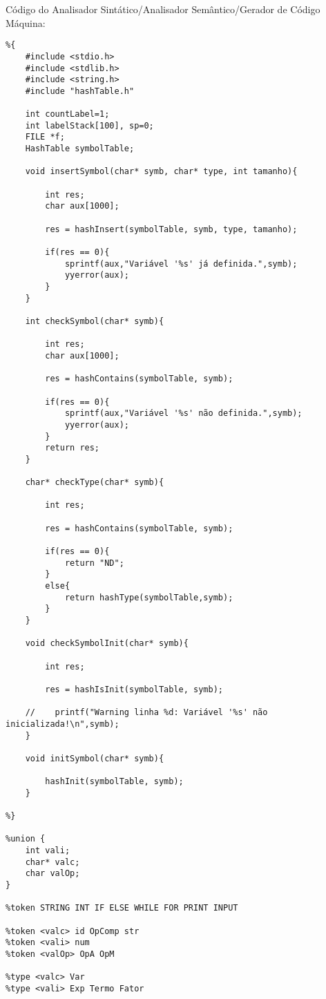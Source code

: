 \documentclass{report}
\begin{document}
Código do Analisador Sintático/Analisador Semântico/Gerador de Código Máquina:
\begin{verbatim}
%{
    #include <stdio.h>
    #include <stdlib.h>
    #include <string.h>
    #include "hashTable.h"

    int countLabel=1;
    int labelStack[100], sp=0;
    FILE *f;
    HashTable symbolTable;

    void insertSymbol(char* symb, char* type, int tamanho){

        int res;
        char aux[1000];

        res = hashInsert(symbolTable, symb, type, tamanho);

        if(res == 0){
            sprintf(aux,"Variável '%s' já definida.",symb);
            yyerror(aux);
        }
    }

    int checkSymbol(char* symb){

        int res;
        char aux[1000];

        res = hashContains(symbolTable, symb);

        if(res == 0){
            sprintf(aux,"Variável '%s' não definida.",symb);
            yyerror(aux);
        }
        return res;
    }

    char* checkType(char* symb){

        int res;

        res = hashContains(symbolTable, symb);

        if(res == 0){
            return "ND";
        }
        else{
            return hashType(symbolTable,symb);
        }
    }

    void checkSymbolInit(char* symb){

        int res;

        res = hashIsInit(symbolTable, symb);

    //    printf("Warning linha %d: Variável '%s' não inicializada!\n",symb);
    }

    void initSymbol(char* symb){

        hashInit(symbolTable, symb);
    }

%}

%union {
    int vali;
    char* valc;
    char valOp;
}

%token STRING INT IF ELSE WHILE FOR PRINT INPUT 

%token <valc> id OpComp str
%token <vali> num
%token <valOp> OpA OpM

%type <valc> Var
%type <vali> Exp Termo Fator


\end{verbatim}
\end{document}
